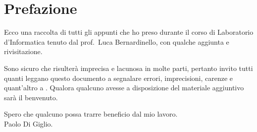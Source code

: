 \chapter*{Prefazione}

Ecco una raccolta di tutti gli appunti che ho preso durante il corso di Laboratorio d'Informatica tenuto dal prof.~Luca Bernardinello, con qualche aggiunta e rivisitazione. 

Sono sicuro che risulterà imprecisa e lacunosa in molte parti, pertanto invito tutti quanti leggano questo documento a segnalare errori, imprecisioni, carenze e quant'altro a . Qualora qualcuno avesse a disposizione del materiale aggiuntivo sarà il benvenuto.

Spero che qualcuno possa trarre beneficio dal mio lavoro.
\\[2ex]
Paolo Di Giglio.